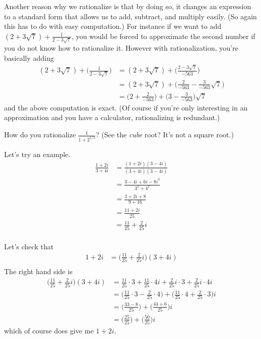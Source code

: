 Another reason why we rationalize is that by doing so,
it changes an expression 
to a standard form that allows us to add, subtract,
and multiply easily. (So again this has to do with easy computation.)
For instance if we want to add $(2 + 3\sqrt{7}) + \frac{1}{2 - 3 \sqrt{7}}$,
you would be forced to approximate the second number if you do not know
how to rationalize it. However with rationalization, you're basically
adding
\begin{align*}
(2 + 3\sqrt{7}) + \biggl( \frac{1}{2 - 3 \sqrt{7}} \biggr)
&=
(2 + 3\sqrt{7}) + \biggl( \frac{2 - 3\sqrt{7}}{-563} \biggr) \\
&=
(2 + 3\sqrt{7}) + \biggl( \frac{2}{-563} - \frac{3}{-563}\sqrt{7} \biggr) \\
&=
\biggl( 2 + \frac{2}{-563} \biggr)
+ \biggl( 3 - \frac{3}{-563} \biggr) \sqrt{7}
\end{align*}
and the above computation is exact.
(Of course if you're only interesting in an approximation
and you have a calculator, rationalizing is redundant.)

\begin{ex}
How do you rationalize $\displaystyle\frac{1}{1 + 2^{1/3}}$? 
(See the \textit{cube} root? It's not a square root.)
\end{ex}

Let's try an example. 
\begin{align*}
\frac{1 + 2i}{3 + 4i}
&= \frac{(1 + 2i)(3 - 4i)}{(3 + 4i)(3 - 4i)} \\
&= \frac{3 - 4i + 6i -8i^2}{3^2 + 4^2} \\
&= \frac{3 +2i + 8}{9 + 16} \\
&= \frac{11 + 2i}{25} \\
&= \frac{11}{25} + \frac{2}{25}i \\
\end{align*}

Let's check that 
\begin{align*}
1 + 2i
&= \biggl( \frac{11}{25} + \frac{2}{25}i \biggr) (3 + 4i)\\
\end{align*}
The right hand side is
\begin{align*}
\biggl( \frac{11}{25} + \frac{2}{25}i \biggr) (3 + 4i)
&= \frac{11}{25} \cdot 3 + \frac{11}{25} \cdot 4i + \frac{2}{25}i \cdot 3 + \frac{2}{25}i \cdot 4i \\
&= \biggl( \frac{11}{25} \cdot 3 -  \frac{2}{25} \cdot 4 \biggr) + \biggl( \frac{11}{25} \cdot 4 + \frac{2}{25} \cdot 3 \biggr)i \\ 
&= \biggl( \frac{33 - 8}{25} \biggr) + \biggl( \frac{44 + 6}{25} \biggr)i \\
&= \biggl( \frac{25}{25} \biggr) + \biggl( \frac{50}{25} \biggr)i 
\end{align*}
which of course does give me $1 + 2i$.

